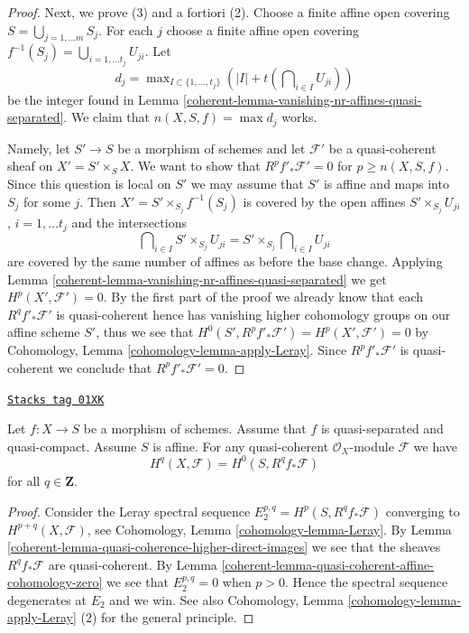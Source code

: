 \begin{proof}
\medskip\noindent
Next, we prove (3) and a fortiori (2). Choose a finite affine open
covering $S = \bigcup_{j = 1, \ldots m} S_j$. For each $j$ choose
a finite affine open covering
$f^{-1}(S_j) = \bigcup_{i = 1, \ldots t_j} U_{ji} $.
Let
$$
d_j = \max\nolimits_{I \subset \{1, \ldots, t_j\}}
\left(|I| + t(\bigcap\nolimits_{i \in I} U_{ji})\right)
$$
be the integer found in
Lemma \ref{coherent-lemma-vanishing-nr-affines-quasi-separated}.
We claim that $n(X, S, f) = \max d_j$ works.

\medskip\noindent
Namely, let $S' \to S$ be a morphism of schemes and let
$\mathcal{F}'$ be a quasi-coherent sheaf on $X' = S' \times_S X$.
We want to show that $R^pf'_*\mathcal{F}' = 0$ for $p \geq n(X, S, f)$.
Since this question is local on $S'$ we may assume that $S'$ is affine
and maps into $S_j$ for some $j$. Then $X' = S' \times_{S_j} f^{-1}(S_j)$
is covered by the open affines $S' \times_{S_j} U_{ji}$, $i = 1, \ldots t_j$
and the intersections
$$
\bigcap\nolimits_{i \in I} S' \times_{S_j} U_{ji} =
S' \times_{S_j} \bigcap\nolimits_{i \in I} U_{ji}
$$
are covered by the same number of affines as before the base change.
Applying
Lemma \ref{coherent-lemma-vanishing-nr-affines-quasi-separated}
we get $H^p(X', \mathcal{F}') = 0$. By the first part of the proof
we already know that each $R^qf'_*\mathcal{F}'$ is quasi-coherent
hence has vanishing higher cohomology groups on our affine scheme $S'$,
thus we see that $H^0(S', R^pf'_*\mathcal{F}') = H^p(X', \mathcal{F}') = 0$
by Cohomology, Lemma \ref{cohomology-lemma-apply-Leray}.
Since $R^pf'_*\mathcal{F}'$ is quasi-coherent
we conclude that $R^pf'_*\mathcal{F}' = 0$.
\end{proof}

\begin{lemma}
\label{coherent-lemma-quasi-coherence-higher-direct-images-application}
\href{https://stacks.math.columbia.edu/tag/01XK}{\texttt{Stacks tag 01XK}}

Let $f : X \to S$ be a morphism of schemes.
Assume that $f$ is quasi-separated and quasi-compact.
Assume $S$ is affine.
For any quasi-coherent $\mathcal{O}_X$-module $\mathcal{F}$
we have
$$
H^q(X, \mathcal{F}) = H^0(S, R^qf_*\mathcal{F})
$$
for all $q \in \mathbf{Z}$.
\end{lemma}

\begin{proof}

Consider the Leray spectral sequence $E_2^{p, q} = H^p(S, R^qf_*\mathcal{F})$
converging to $H^{p + q}(X, \mathcal{F})$, see
Cohomology, Lemma \ref{cohomology-lemma-Leray}.
By Lemma \ref{coherent-lemma-quasi-coherence-higher-direct-images}
we see that the sheaves $R^qf_*\mathcal{F}$ are quasi-coherent.
By Lemma \ref{coherent-lemma-quasi-coherent-affine-cohomology-zero}
we see that $E_2^{p, q} = 0$ when $p > 0$.
Hence the spectral sequence degenerates at $E_2$ and we win.
See also
Cohomology, Lemma \ref{cohomology-lemma-apply-Leray} (2)
for the general principle.
\end{proof}

